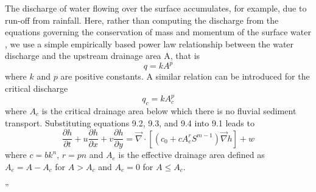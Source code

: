 The discharge of water flowing over the surface accumulates, for example, due to run-off from rainfall. Here,
rather than computing the discharge from the equations governing the conservation of mass and
momentum of the surface water \textcite{sica06}, we use a simple empirically 
based power law relationship between the water discharge and the upstream drainage area A,
that is
\[
q=kA^p
\]
where $k$ and $p$ are positive constants. A similar relation can be introduced for the critical discharge
\[
q_c=kA_c^p
\]
where $A_c$ is the critical drainage area below which there is no fluvial sediment transport. Substituting
equations 9.2, 9.3, and 9.4 into 9.1 leads to
\[
\frac{\partial h}{\partial t} + u \frac{\partial h}{\partial x}+ v \frac{\partial h}{\partial y}
= \vec\nabla \cdot \left[
(c_0 + c A_e^r S^{m-1}) \vec\nabla h
\right] + w
\]
where $c=bk^n$, $r=pn$ and $A_e$ is the effective drainage area defined as $A_e = A-A_c$ 
for $A>A_c$ and $A_e = 0$ for $A \le A_c$.




''
